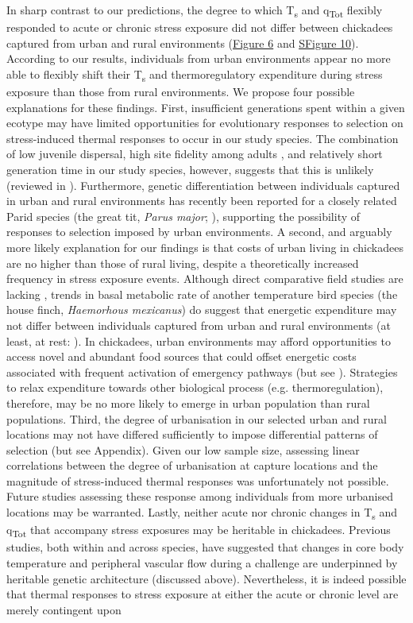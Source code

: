 \documentclass[12pt]{article}
\begin{document}
\noindent In sharp contrast to our predictions, the degree to which T\textsubscript{s} and q\textsubscript{Tot} flexibly responded to acute or chronic stress exposure did not differ between chickadees captured from urban and rural environments (\hyperref[Fig4.6]{Figure 6} and \hyperref[FigC.10]{SFigure 10}). According to our results, individuals from urban environments appear no more able to flexibly shift their T\textsubscript{s} and thermoregulatory expenditure during stress exposure than those from rural environments. We propose four possible explanations for these findings. First, insufficient generations spent within a given ecotype may have limited opportunities for evolutionary responses to selection on stress-induced thermal responses to occur in our study species. The combination of low juvenile dispersal, high site fidelity among adults \citep{weise_1979}, and relatively short generation time in our study species, however, suggests that this is unlikely (reviewed in \citealt{mcdonnell_2015}). Furthermore, genetic differentiation between individuals captured in urban and rural environments has recently been reported for a closely related Parid species (the great tit, \textit{Parus major}; \citealt{perrier_2018}), supporting the possibility of responses to selection imposed by urban environments. A second, and arguably more likely explanation for our findings is that costs of urban living in chickadees are no higher than those of rural living, despite a theoretically increased frequency in stress exposure events. Although direct comparative field studies are lacking \citep{sepp_2018}, trends in basal metabolic rate of another temperature bird species (the house finch, \textit{Haemorhous mexicanus}) do suggest that energetic expenditure may not differ between individuals captured from urban and rural environments (at least, at rest: \citealt{hutton_2018}). In chickadees, urban environments may afford opportunities to access novel and abundant food sources \citep{robb_2008,prasher_2019} that could offset energetic costs associated with frequent activation of emergency pathways (but see \citealt{demeyrier_2017}). Strategies to relax expenditure towards other biological process (e.g. thermoregulation), therefore, may be no more likely to emerge in urban population than rural populations. Third, the degree of urbanisation in our selected urban and rural locations may not have differed sufficiently to impose differential patterns of selection (but see Appendix). Given our low sample size, assessing linear correlations between the degree of urbanisation at capture locations and the magnitude of stress-induced thermal responses was unfortunately not possible. Future studies assessing these response among individuals from more urbanised locations may be warranted. Lastly, neither acute nor chronic changes in T\textsubscript{s} and q\textsubscript{Tot} that accompany stress exposures may be heritable in chickadees. Previous studies, both within and across species, have suggested that changes in core body temperature and peripheral vascular flow during a challenge are underpinned by heritable genetic architecture (discussed above). Nevertheless, it is indeed possible that thermal responses to stress exposure at either the acute or chronic level are merely contingent upon 
\end{document}
